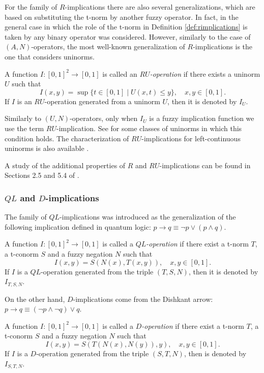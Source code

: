 For the family of $R$-implications there are also several generalizations, which are based on substituting the t-norm by another fuzzy operator. In fact, in \cite{Ouyang2012} the general case in which the role of the t-norm in Definition \ref{def:rimplications} is taken by any binary operator was considered. However, similarly to the case of $(A,N)$-operators, the most well-known generalization of $R$-implications is the one that considers uninorms.

\begin{definition}\label{def:ruoperations}
	A function $I:[0,1]^2 \to [0,1]$ is called an \emph{$RU$-operation} if there exists a uninorm $U$ such that
	$$I(x,y) = \sup \{t \in [0,1] \mid U(x,t) \leq y\}, \quad x,y \in [0,1].$$
	If $I$ is an $RU$-operation generated from a uninorm $U$, then it is denoted by $I_U$.
\end{definition}

Similarly to $(U,N)$-operators, only when $I_U$ is a fuzzy implication function we use the term $RU$-implication. See \cite[Corollary 5.4.4]{Baczynski2008} for some classes of uninorms in which this condition holds. The characterization of $RU$-implications for left-continuous uninorms is also available \cite{Aguilo2010}.

A study of the additional properties of $R$ and $RU$-implications can be found in Sections 2.5 and 5.4 of \cite{Baczynski2008}.

\subsubsection{$QL$ and $D$-implications}
The family of $QL$-implications was introduced as the generalization of the following implication defined in quantum logic: $p \to q \equiv \neg p \vee ( p \wedge q)$.
\begin{definition}\label{def:QLimplications}
	A function $I:[0,1]^2 \to [0,1]$ is called a \emph{$QL$-operation} if there exist a t-norm $T$, a t-conorm $S$ and a fuzzy negation $N$ such that
	$$I(x,y)=S(N(x),T(x,y)), \quad x,y \in [0,1].$$
	If $I$ is a $QL$-operation generated from the triple $(T,S,N)$, then it is denoted by $I_{T,S,N}$.
\end{definition}
On the other hand, $D$-implications come from the Dishkant arrow: $p \to q \equiv (\neg p \wedge \neg q)\vee q$. 
\begin{definition}
	A function $I : [0,1]^2 \to [0,1]$ is called a \emph{$D$-operation} if there exist a t-norm $T$, a t-conorm $S$ and a fuzzy negation $N$ such that
	$$I(x,y)=S(T(N(x),N(y)),y), \quad x,y \in [0,1].$$
	If $I$ is a $D$-operation generated from the triple $(S,T,N)$, then is denoted by $I_{S,T,N}$.
\end{definition}

